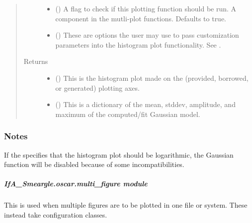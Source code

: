 \documentclass[letterpaper,10pt,english]{sphinxmanual}
\begin{document}
\begin{fulllineitems}
\begin{quote}
\begin{description}
\begin{itemize}
\item {} 
 (\sphinxstyleliteralemphasis{\sphinxupquote{ (}}\sphinxstyleliteralemphasis{\sphinxupquote{)}}) \textendash{} A flag to check if this plotting function should be run. A component
in the mutli-plot functions. Defaults to true.

\item {} 
 () \textendash{} These are options the user may use to pass customization parameters
into the histogram plot functionality.
See .

\end{itemize}

\item[{Returns}] \leavevmode
\begin{itemize}
\item {} 
 () \textendash{} This is the histogram plot made on the (provided, borrowed, or
generated) plotting axes.

\item {} 
 () \textendash{} This is a dictionary of the mean, stddev, amplitude, and maximum of
the computed/fit Gaussian model.

\end{itemize}


\end{description}\end{quote}
\subsubsection*{Notes}

If the  specifies that the histogram plot
should be logarithmic, the Gaussian function will be disabled because of
some incompatibilities.

\end{fulllineitems}



\subparagraph{IfA\_Smeargle.oscar.multi\_figure module}
\label{\detokenize{python_docstrings/IfA_Smeargle.oscar.multi_figure:module-IfA_Smeargle.oscar.multi_figure}}\label{\detokenize{python_docstrings/IfA_Smeargle.oscar.multi_figure:ifa-smeargle-oscar-multi-figure-module}}\label{\detokenize{python_docstrings/IfA_Smeargle.oscar.multi_figure::doc}}
This is used when multiple figures are to be plotted in one file or system.
These instead take configuration classes.
\end{document}
